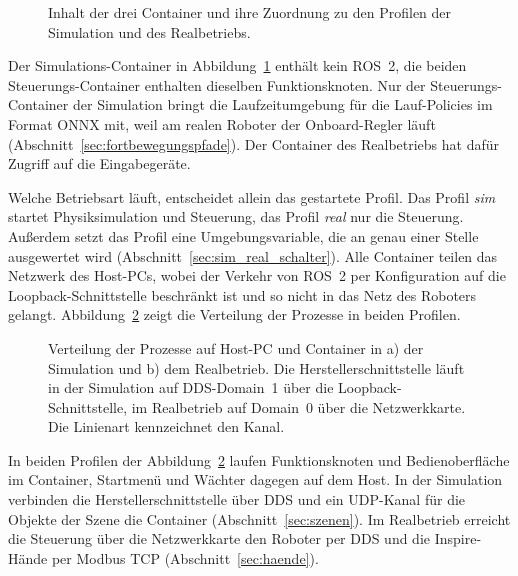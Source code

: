 \begin{figure}[htbp]
  \centering
  
  \caption[Inhalt der drei Container]{Inhalt der drei Container und ihre Zuordnung zu den Profilen der Simulation und des Realbetriebs.}
  \label{fig:container_inhalt}
\end{figure}

Der Simulations-Container in Abbildung~\ref{fig:container_inhalt} enthält kein ROS~2, die beiden Steuerungs-Container enthalten dieselben Funktionsknoten.
Nur der Steuerungs-Container der Simulation bringt die Laufzeitumgebung für die Lauf-Policies im Format ONNX mit, weil am realen Roboter der Onboard-Regler läuft (Abschnitt~\ref{sec:fortbewegungspfade}).
Der Container des Realbetriebs hat dafür Zugriff auf die Eingabegeräte.

Welche Betriebsart läuft, entscheidet allein das gestartete Profil.
Das Profil \emph{sim} startet Physiksimulation und Steuerung, das Profil \emph{real} nur die Steuerung.
Außerdem setzt das Profil eine Umgebungsvariable, die an genau einer Stelle ausgewertet wird (Abschnitt~\ref{sec:sim_real_schalter}).
Alle Container teilen das Netzwerk des Host-PCs, wobei der Verkehr von ROS~2 per Konfiguration auf die Loopback-Schnittstelle beschränkt ist und so nicht in das Netz des Roboters gelangt.
Abbildung~\ref{fig:verteilung} zeigt die Verteilung der Prozesse in beiden Profilen.

\begin{figure}[htbp]
  \centering
  
  \caption[Verteilung der Prozesse auf Host und Container]{Verteilung der Prozesse auf Host-PC und Container in a) der Simulation und b) dem Realbetrieb. Die Herstellerschnittstelle läuft in der Simulation auf DDS-Domain~1 über die Loopback-Schnittstelle, im Realbetrieb auf Domain~0 über die Netzwerkkarte. Die Linienart kennzeichnet den Kanal.}
  \label{fig:verteilung}
\end{figure}

In beiden Profilen der Abbildung~\ref{fig:verteilung} laufen Funktionsknoten und Bedienoberfläche im Container, Startmenü und Wächter dagegen auf dem Host.
In der Simulation verbinden die Herstellerschnittstelle über DDS und ein UDP-Kanal für die Objekte der Szene die Container (Abschnitt~\ref{sec:szenen}).
Im Realbetrieb erreicht die Steuerung über die Netzwerkkarte den Roboter per DDS und die Inspire-Hände per Modbus TCP (Abschnitt~\ref{sec:haende}).

